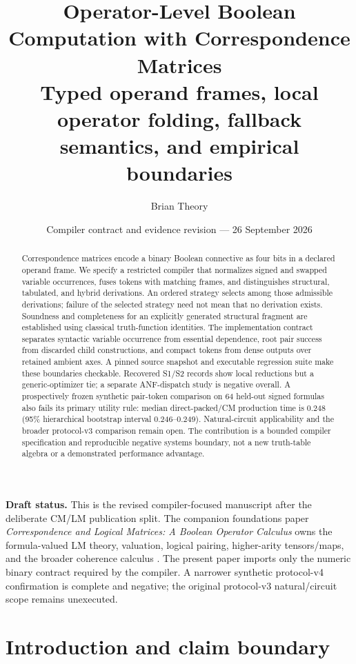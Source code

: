 \documentclass[10pt]{article}
\title{\vspace{-1.3em}\textbf{Operator-Level Boolean Computation with Correspondence Matrices}\\[0.35em]
\large Typed operand frames, local operator folding, fallback semantics, and empirical boundaries}
\author{Brian Theory}
\date{Compiler contract and evidence revision --- 26 September 2026}
\theoremstyle{plain}
\theoremstyle{definition}
\theoremstyle{remark}
\begin{document}
\maketitle

\begin{abstract}
Correspondence matrices encode a binary Boolean connective as four bits in a declared operand frame. We specify a restricted compiler that normalizes signed and swapped variable occurrences, fuses tokens with matching frames, and distinguishes structural, tabulated, and hybrid derivations. An ordered strategy selects among those admissible derivations; failure of the selected strategy need not mean that no derivation exists. Soundness and completeness for an explicitly generated structural fragment are established using classical truth-function identities. The implementation contract separates syntactic variable occurrence from essential dependence, root pair success from discarded child constructions, and compact tokens from dense outputs over retained ambient axes. A pinned source snapshot and executable regression suite make these boundaries checkable. Recovered S1/S2 records show local reductions but a generic-optimizer tie; a separate ANF-dispatch study is negative overall. A prospectively frozen synthetic pair-token comparison on 64 held-out signed formulas also fails its primary utility rule: median direct-packed/CM production time is 0.248 (95\% hierarchical bootstrap interval 0.246--0.249). Natural-circuit applicability and the broader protocol-v3 comparison remain open. The contribution is a bounded compiler specification and reproducible negative systems boundary, not a new truth-table algebra or a demonstrated performance advantage.

\end{abstract}

\noindent\textbf{Draft status.} This is the revised compiler-focused manuscript after the deliberate CM/LM publication split. The companion foundations paper \emph{Correspondence and Logical Matrices: A Boolean Operator Calculus} owns the formula-valued LM theory, valuation, logical pairing, higher-arity tensors/maps, and the broader coherence calculus \cite{TheoryFoundations2026}. The present paper imports only the numeric binary contract required by the compiler. A narrower synthetic protocol-v4 confirmation is complete and negative; the original protocol-v3 natural/circuit scope remains unexecuted.

\section{Introduction and claim boundary}
\end{document}
